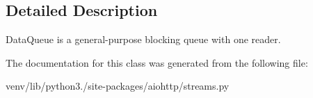 \subsection{Detailed Description}
\begin{DoxyVerb}DataQueue is a general-purpose blocking queue with one reader.\end{DoxyVerb}
 

The documentation for this class was generated from the following file\+:\begin{DoxyCompactItemize}
\item 
venv/lib/python3./site-\/packages/aiohttp/streams.\+py\end{DoxyCompactItemize}
